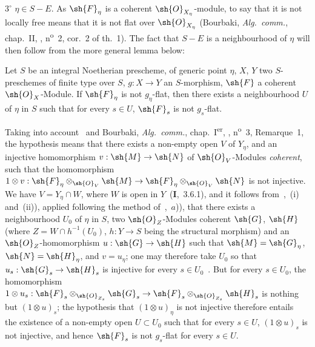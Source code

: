 $3^\circ$ $\eta\in S-E$.
As $\sh{F}_\eta$ is a coherent $\sh{O}_{X_\eta}$-module, to say that it is not locally free means that it is not flat over $\sh{O}_{X_\eta}$ (Bourbaki, \emph{Alg.\ comm.}, chap.~II, , n\textsuperscript{o}~2, cor.~2 of th.~1).
The fact that $S-E$ is a neighbourhood of $\eta$ will then follow from the more general lemma below:

\begin{lemma}[9.4.7.1]
\label{IV.9.4.7.1}
Let $S$ be an integral Noetherian prescheme, of generic point $\eta$, $X$, $Y$ two $S$-preschemes of finite type over $S$, $g:X\to Y$ an $S$-morphism, $\sh{F}$ a coherent $\sh{O}_X$-Module.
If $\sh{F}_\eta$ is not $g_\eta$-flat, then there exists a neighbourhood $U$ of $\eta$ in $S$ such that for every $s\in U$, $\sh{F}_s$ is not $g_s$-flat.
\end{lemma}

Taking into account~ and Bourbaki, \emph{Alg.\ comm.}, chap.~I\textsuperscript{er}, , n\textsuperscript{o}~3, Remarque~1, the hypothesis means that there exists a non-empty open $V$ of $Y_\eta$, and an injective homomorphism $v:\sh{M}\to\sh{N}$ of $\sh{O}_V$-Modules \emph{coherent}, such that the homomorphism $1\otimes v:\sh{F}_\eta\otimes_{\sh{O}_V}\sh{M}\to\sh{F}_\eta\otimes_{\sh{O}_V}\sh{N}$ is not injective.
We have $V=Y_\eta\cap W$, where $W$ is open in $Y$~(\textbf{I},~3.6.1), and it follows from~,~(i) and~(ii)), applied following the method of~,~$a$)), that there exists a neighbourhood $U_0$ of $\eta$ in $S$, two $\sh{O}_Z$-Modules
coherent $\sh{G}$, $\sh{H}$ (where $Z=W\cap h^{-1}(U_0)$, $h:Y\to S$ being the structural morphism) and an $\sh{O}_Z$-homomorphism $u:\sh{G}\to\sh{H}$ such that $\sh{M}=\sh{G}_\eta$, $\sh{N}=\sh{H}_\eta$, and $v=u_\eta$; one may therefore take $U_0$ so that $u_s:\sh{G}_s\to\sh{H}_s$ is injective for every $s\in U_0$~.
But for every $s\in U_0$, the homomorphism $1\otimes u_s:\sh{F}_s\otimes_{\sh{O}_{Z_s}}\sh{G}_s\to\sh{F}_s\otimes_{\sh{O}_{Z_s}}\sh{H}_s$ is nothing but $(1\otimes u)_s$; the hypothesis that $(1\otimes u)_\eta$ is not injective therefore entails~ the existence of a non-empty open $U\subset U_0$ such that for every $s\in U$, $(1\otimes u)_s$ is not injective, and hence $\sh{F}_s$ is not $g_s$-flat for every $s\in U$.

